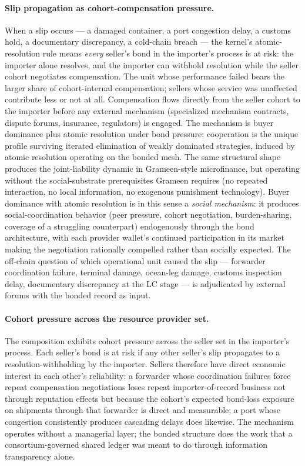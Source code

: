\documentclass[11pt,a4paper]{article}
\theoremstyle{definition}
\theoremstyle{remark}
\begin{document}
\paragraph{Slip propagation as cohort-compensation pressure.}
When a slip occurs --- a damaged container, a port congestion
delay, a customs hold, a documentary discrepancy, a cold-chain
breach --- the kernel's atomic-resolution rule means
\emph{every} seller's bond in the importer's process is at risk:
the importer alone resolves, and the importer can withhold
resolution while the seller cohort negotiates compensation. The
unit whose performance failed bears the larger share of
cohort-internal compensation; sellers whose service was unaffected
contribute less or not at all. Compensation flows directly from
the seller cohort to the importer before any external mechanism
(specialized mechanism contracts, dispute forums, insurance,
regulators) is engaged. The mechanism is buyer dominance plus
atomic resolution under bond pressure: cooperation is the unique
profile surviving iterated elimination of weakly dominated
strategies, induced by atomic resolution operating on the bonded
mesh. The same structural shape produces the joint-liability
dynamic in Grameen-style microfinance, but operating without the
social-substrate prerequisites Grameen requires (no repeated
interaction, no local information, no exogenous punishment
technology). Buyer dominance with atomic resolution is in this
sense a \emph{social mechanism}: it produces social-coordination
behavior (peer pressure, cohort negotiation, burden-sharing,
coverage of a struggling counterpart) endogenously through the
bond architecture, with each provider wallet's continued
participation in its market making the negotiation rationally
compelled rather than socially expected. The off-chain question of
which operational unit caused the slip --- forwarder coordination
failure, terminal damage, ocean-leg damage, customs inspection
delay, documentary discrepancy at the LC stage --- is adjudicated
by external forums with the bonded record as input.

\paragraph{Cohort pressure across the resource provider set.}
The composition exhibits cohort pressure across the seller set in
the importer's process. Each seller's bond is at risk if any
other seller's slip propagates to a resolution-withholding by the
importer. Sellers therefore have direct economic interest in
each other's reliability: a forwarder whose coordination failures
force repeat compensation negotiations loses repeat
importer-of-record business not through reputation effects but
because the cohort's expected bond-loss exposure on shipments
through that forwarder is direct and measurable; a port whose
congestion consistently produces cascading delays does likewise.
The mechanism operates without a managerial layer; the bonded
structure does the work that a consortium-governed shared ledger
was meant to do through information transparency alone.
\end{document}

